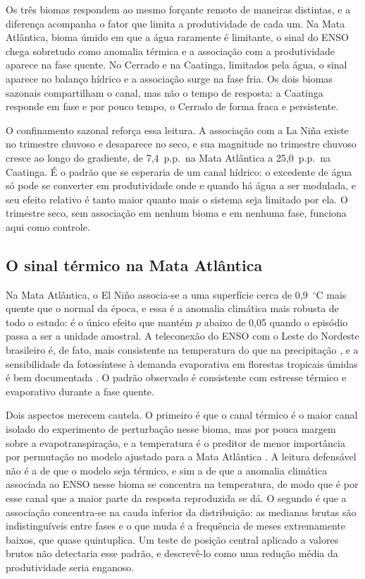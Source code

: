 \documentclass[a4paper,fleqn]{cas-sc}
\begin{document}
Os três biomas respondem ao mesmo forçante remoto de maneiras distintas, e a diferença acompanha o fator que limita a produtividade de cada um. Na Mata Atlântica, bioma úmido em que a água raramente é limitante, o sinal do ENSO chega sobretudo como anomalia térmica e a associação com a produtividade aparece na fase quente. No Cerrado e na Caatinga, limitados pela água, o sinal aparece no balanço hídrico e a associação surge na fase fria. Os dois biomas sazonais compartilham o canal, mas não o tempo de resposta: a Caatinga responde em fase e por pouco tempo, o Cerrado de forma fraca e persistente.

O confinamento sazonal reforça essa leitura. A associação com a La Niña existe no trimestre chuvoso e desaparece no seco, e sua magnitude no trimestre chuvoso cresce ao longo do gradiente, de 7,4~p.p.\ na Mata Atlântica a 25,0~p.p.\ na Caatinga. É o padrão que se esperaria de um canal hídrico: o excedente de água só pode se converter em produtividade onde e quando há água a ser modulada, e seu efeito relativo é tanto maior quanto mais o sistema seja limitado por ela. O trimestre seco, sem associação em nenhum bioma e em nenhuma fase, funciona aqui como controle.

\subsection{O sinal térmico na Mata Atlântica}

Na Mata Atlântica, o El Niño associa-se a uma superfície cerca de 0,9~$^{\circ}$C mais quente que o normal da época, e essa é a anomalia climática mais robusta de todo o estudo: é o único efeito que mantém $p$ abaixo de 0,05 quando o episódio passa a ser a unidade amostral. A teleconexão do ENSO com o Leste do Nordeste brasileiro é, de fato, mais consistente na temperatura do que na precipitação \citep{ropelewski1987, kayano2007}, e a sensibilidade da fotossíntese à demanda evaporativa em florestas tropicais úmidas é bem documentada \citep{lawson2019, vourlitis2022}. O padrão observado é consistente com estresse térmico e evaporativo durante a fase quente.

Dois aspectos merecem cautela. O primeiro é que o canal térmico é o maior canal isolado do experimento de perturbação nesse bioma, mas por pouca margem sobre a evapotranspiração, e a temperatura é o preditor de menor importância por permutação no modelo ajustado para a Mata Atlântica \citep{oliveira2026}. A leitura defensável não é a de que o modelo seja térmico, e sim a de que a anomalia climática associada ao ENSO nesse bioma se concentra na temperatura, de modo que é por esse canal que a maior parte da resposta reproduzida se dá. O segundo é que a associação concentra-se na cauda inferior da distribuição: as medianas brutas são indistinguíveis entre fases e o que muda é a frequência de meses extremamente baixos, que quase quintuplica. Um teste de posição central aplicado a valores brutos não detectaria esse padrão, e descrevê-lo como uma redução média da produtividade seria enganoso.
\end{document}
